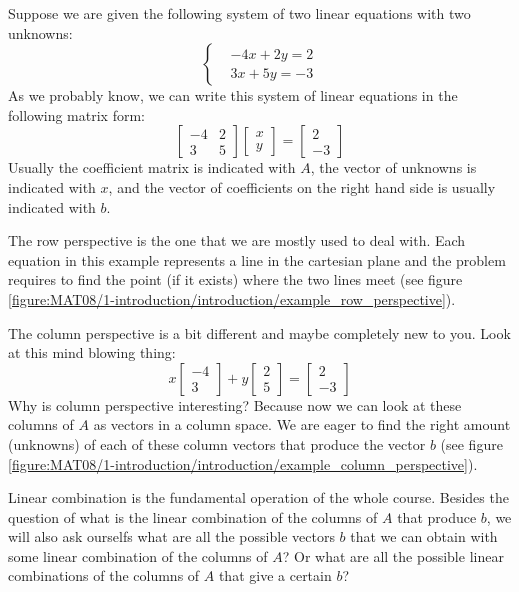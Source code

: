 \documentclass[computationalMathematics.tex]{subfiles}
\begin{document}
\begin{example}
    Suppose we are given the following system of two linear equations with two unknowns:
    \[
        \begin{cases}
            &-4x + 2y = 2 \\
            &3x + 5y = -3    
        \end{cases}
    \]
    As we probably know, we can write this system of linear equations in the following matrix form:
    \[
        \begin{bmatrix}
            -4 & 2 \\
            3 & 5
        \end{bmatrix}
        \begin{bmatrix}
            x \\
            y
        \end{bmatrix}
        =
        \begin{bmatrix}
            2 \\
            -3
        \end{bmatrix}
    \]
    Usually the coefficient matrix is indicated with $A$, the vector of unknowns is indicated with $x$, and the vector of coefficients on the right hand side is usually indicated with $b$.
    \par The row perspective is the one that we are mostly used to deal with. Each equation in this example represents a line in the cartesian plane and the problem requires to find the point (if it exists) where the two lines meet (see figure \ref{figure:MAT08/1-introduction/introduction/example_row_perspective}).
    \par The column perspective is a bit different and maybe completely new to you. Look at this mind blowing thing:
    \[
        x \begin{bmatrix} -4 \\ 3 \end{bmatrix} + y \begin{bmatrix} 2 \\ 5 \end{bmatrix} = \begin{bmatrix} 2 \\ -3 \end{bmatrix}
    \]
    Why is column perspective interesting? Because now we can look at these columns of $A$ as vectors in a column space. We are eager to find the right amount (unknowns) of each of these column vectors that produce the vector $b$ (see figure \ref{figure:MAT08/1-introduction/introduction/example_column_perspective}).
    \par Linear combination is the fundamental operation of the whole course. Besides the question of what is the linear combination of the columns of $A$ that produce $b$, we will also ask ourselfs what are all the possible vectors $b$ that we can obtain with some linear combination of the columns of $A$? Or what are all the possible linear combinations of the columns of $A$ that give a certain $b$?
\end{example}
\end{document}
